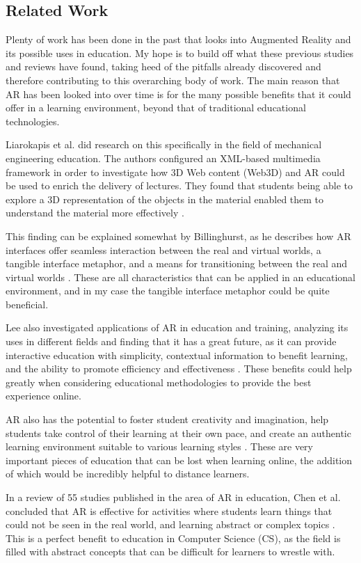 \documentclass[sigconf]{acmart}
\begin{document}
\subsection{Related Work}
Plenty of work has been done in the past that looks into Augmented Reality and its possible uses in education. My hope is to build off what these previous studies and reviews have found, taking heed of the pitfalls already discovered and therefore contributing to this overarching body of work. The main reason that AR has been looked into over time is for the many possible benefits that it could offer in a learning environment, beyond that of traditional educational technologies.

Liarokapis et al. did research on this specifically in the field of mechanical engineering education. The authors configured an XML-based multimedia framework in order to investigate how 3D Web content (Web3D) and AR could be used to enrich the delivery of lectures. They found that students being able to explore a 3D representation of the objects in the material enabled them to understand the material more effectively \cite{liarokapis04}.

This finding can be explained somewhat by Billinghurst, as he describes how AR interfaces offer seamless interaction between the real and virtual worlds, a tangible interface metaphor, and a means for transitioning between the real and virtual worlds \cite{billinghurst02}. These are all characteristics that can be applied in an educational environment, and in my case the tangible interface metaphor could be quite beneficial.

Lee also investigated applications of AR in education and training, analyzing its uses in different fields and finding that it has a great future, as it can provide interactive education with simplicity, contextual information to benefit learning, and the ability to promote efficiency and effectiveness \cite{lee12}. These benefits could help greatly when considering educational methodologies to provide the best experience online.

AR also has the potential to foster student creativity and imagination, help students take control of their learning at their own pace, and create an authentic learning environment suitable to various learning styles \cite{yuen11}. These are very important pieces of education that can be lost when learning online, the addition of which would be incredibly helpful to distance learners.

In a review of 55 studies published in the area of AR in education, Chen et al. concluded that AR is effective for activities where students learn things that could not be seen in the real world, and learning abstract or complex topics \cite{chen17}. This is a perfect benefit to education in Computer Science (CS), as the field is filled with abstract concepts that can be difficult for learners to wrestle with.
\end{document}
